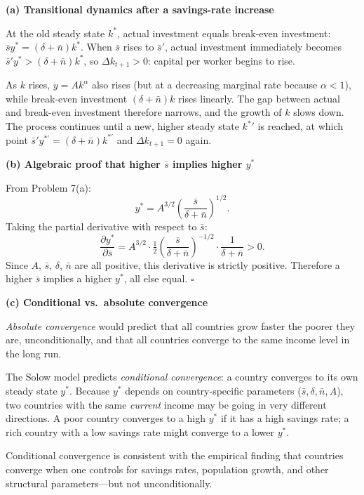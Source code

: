 \documentclass[12pt]{article}
\newenvironment{soln}{%
  \begin{tcolorbox}[
    breakable,
    colback=blue!4!white,
    colframe=blue!50!black,
    title={\textbf{Solution}},
    fonttitle=\small,
    left=4pt, right=4pt, top=4pt, bottom=4pt
  ]
}{%
  \end{tcolorbox}
}
\begin{document}
\begin{soln}
\textbf{(a) Transitional dynamics after a savings-rate increase}

At the old steady state $k^*$, actual investment equals break-even investment:
$\bar{s}y^* = (\delta+\bar{n})k^*$.  When $\bar{s}$ rises to $\bar{s}'$,
actual investment immediately becomes $\bar{s}'y^* > (\delta+\bar{n})k^*$,
so $\Delta k_{t+1} > 0$: capital per worker begins to rise.

As $k$ rises, $y = Ak^\alpha$ also rises (but at a decreasing marginal rate
because $\alpha < 1$), while break-even investment $(\delta+\bar{n})k$ rises
linearly.  The gap between actual and break-even investment therefore narrows,
and the growth of $k$ slows down.  The process continues until a new, higher
steady state ${k^*}'$ is reached, at which point $\bar{s}'y^{*\prime} =
(\delta+\bar{n})k^{*\prime}$ and $\Delta k_{t+1} = 0$ again.

\textbf{(b) Algebraic proof that higher $\bar{s}$ implies higher $y^*$}

From Problem 7(a):
\[
  y^* = A^{3/2}\left(\frac{\bar{s}}{\delta+\bar{n}}\right)^{1/2}.
\]
Taking the partial derivative with respect to $\bar{s}$:
\[
  \frac{\partial y^*}{\partial \bar{s}}
  = A^{3/2} \cdot \tfrac{1}{2}\left(\frac{\bar{s}}{\delta+\bar{n}}\right)^{-1/2}
    \cdot \frac{1}{\delta+\bar{n}} > 0.
\]
Since $A$, $\bar{s}$, $\delta$, $\bar{n}$ are all positive, this derivative
is strictly positive.  Therefore a higher $\bar{s}$ implies a higher $y^*$,
all else equal. \hfill $\square$

\textbf{(c) Conditional vs.\ absolute convergence}

\textit{Absolute convergence} would predict that all countries grow faster
the poorer they are, unconditionally, and that all countries converge to the
same income level in the long run.

The Solow model predicts \textit{conditional convergence}: a country converges
to its own steady state $y^*$.  Because $y^*$ depends on country-specific
parameters ($\bar{s},\delta,\bar{n},A$), two countries with the same
\emph{current} income may be going in very different directions.  A poor
country converges to a high $y^*$ if it has a high savings rate; a rich
country with a low savings rate might converge to a lower $y^*$.

Conditional convergence is consistent with the empirical finding that
countries converge when one controls for savings rates, population growth,
and other structural parameters---but not unconditionally.


\end{soln}
\end{document}
